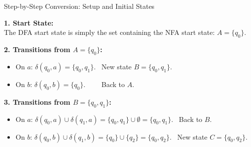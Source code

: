 \documentclass[10pt,aspectratio=169]{beamer}
\begin{document}
\begin{frame}{Step-by-Step Conversion: Setup and Initial States}

\textbf{1. Start State:} \\
The DFA start state is simply the set containing the NFA start state: $A = \{q_0\}$.

\vspace{1em}
\pause

\textbf{2. Transitions from $A = \{q_0\}$:}
\begin{itemize}
\item On $a$: $\delta(q_0, a) = \{q_0, q_1\}$. \quad \textrightarrow\ New state $B = \{q_0, q_1\}$.
\item On $b$: $\delta(q_0, b) = \{q_0\}$. \quad \quad \ \ \ \textrightarrow\ Back to $A$.
\end{itemize}

\vspace{1em}
\pause

\textbf{3. Transitions from $B = \{q_0, q_1\}$:}
\begin{itemize}
\item On $a$: $\delta(q_0, a) \cup \delta(q_1, a) = \{q_0, q_1\} \cup \emptyset = \{q_0, q_1\}$. \quad \textrightarrow\ Back to $B$.
\item On $b$: $\delta(q_0, b) \cup \delta(q_1, b) = \{q_0\} \cup \{q_2\} = \{q_0, q_2\}$. \quad \textrightarrow\ New state $C = \{q_0, q_2\}$.
\end{itemize}

\end{frame}
\end{document}
